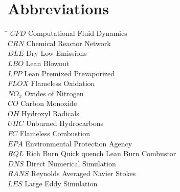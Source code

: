   \section{Abbreviations}
\begin{tabbing}
\hspace*{3cm}\= \kill
  $CFD$ \> Computational Fluid Dynamics \\
  $CRN$ \> Chemical Reactor Network \\
  $DLE$ \> Dry Low Emissions \\
  $LBO$ \> Lean Blowout \\
  $LPP$ \> Lean Premixed Prevaporized \\
  $FLOX$ \> Flameless Oxidation \\
  $NO_x$ \> Oxides of Nitrogen \\
  $CO$ \> Carbon Monoxide \\
  $OH$ \> Hydroxyl Radicals \\
  $UHC$ \> Unburned Hydrocarbons \\
  $FC$ \> Flameless Combustion \\
  $EPA$ \> Environmental Protection Agency \\
  $RQL$ \> Rich Burn Quick quench Lean Burn Combustor \\
  $DNS$ \> Direct Numerical Simulation \\
  $RANS$ \> Reynolds Averaged Navier Stokes \\
  $LES$ \> Large Eddy Simulation \\
  
  

\end{tabbing}
%

\endgroup			

\vfill 
